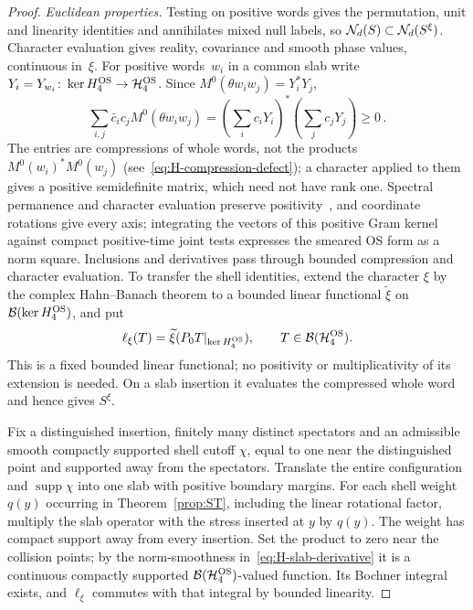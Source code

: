 \begin{proof}
\emph{Euclidean properties.} Testing on positive words gives the permutation, unit and linearity identities and annihilates mixed null labels, so $\mathcal{N}_{d}(S)\subset\mathcal{N}_{d}(S^\xi)$. Character evaluation gives reality, covariance and smooth phase values, continuous in~$\xi$. For positive words~$w_i$ in a common slab write $Y_i=Y_{w_i}\colon\ker H_4^{\rm OS}\to\mathcal H_4^{\rm OS}$. Since $M^0(\theta w_iw_j)=Y_i^*Y_j$,
\begin{equation*}
\sum_{i,j}\bar c_ic_jM^0(\theta w_iw_j)=\left(\sum_i c_iY_i\right)^*\left(\sum_jc_jY_j\right)\ge0\,.
\end{equation*}
The entries are compressions of whole words, not the products $M^0(w_i)^*M^0(w_j)$ (see~\eqref{eq:H-compression-defect}); a character applied to them gives a positive semidefinite matrix, which need not have rank one. Spectral permanence and character evaluation preserve positivity~\cite[Theorems~2.5.1(1) and~2.6.4]{Landsman1998}, and coordinate rotations give every axis; integrating the vectors of this positive Gram kernel against compact positive-time joint tests expresses the smeared OS form as a norm square. Inclusions and derivatives pass through bounded compression and character evaluation. To transfer the shell identities, extend the character $\xi$ by the complex Hahn--Banach theorem to a bounded linear functional $\widetilde\xi$ on $\mathcal B(\ker H_4^{\rm OS})$, and put
\[
 \ell_\xi(T)=\widetilde\xi(P_0T|_{\ker H_4^{\rm OS}}),
 \qquad T\in\mathcal B(\mathcal H_4^{\rm OS}).
\]
This is a fixed bounded linear functional; no positivity or multiplicativity of its extension is needed. On a slab insertion it evaluates the compressed whole word and hence gives $S^\xi$.

Fix a distinguished insertion, finitely many distinct spectators and an admissible smooth compactly supported shell cutoff $\chi$, equal to one near the distinguished point and supported away from the spectators. Translate the entire configuration and $\operatorname{supp}\chi$ into one slab with positive boundary margins. For each shell weight $q(y)$ occurring in Theorem~\ref{prop:ST}, including the linear rotational factor, multiply the slab operator with the stress inserted at $y$ by $q(y)$. The weight has compact support away from every insertion. Set the product to zero near the collision points; by the norm-smoothness in~\eqref{eq:H-slab-derivative} it is a continuous compactly supported $\mathcal B(\mathcal H_4^{\rm OS})$-valued function. Its Bochner integral exists, and $\ell_\xi$ commutes with that integral by bounded linearity.


\end{proof}
